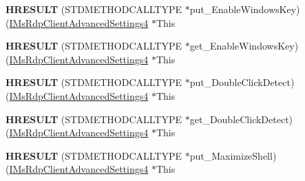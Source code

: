 \begin{DoxyCompactItemize}
\item 
\mbox{\label{struct_m_s_t_s_c_lib_1_1_i_ms_rdp_client_advanced_settings4_vtbl_a252c20e998252fad198e2894be5b028f}} 
{\bfseries H\+R\+E\+S\+U\+LT} (S\+T\+D\+M\+E\+T\+H\+O\+D\+C\+A\+L\+L\+T\+Y\+PE $\ast$put\+\_\+\+Enable\+Windows\+Key)(\hyperlink{interface_m_s_t_s_c_lib_1_1_i_ms_rdp_client_advanced_settings4}{I\+Ms\+Rdp\+Client\+Advanced\+Settings4} $\ast$This
\item 
\mbox{\label{struct_m_s_t_s_c_lib_1_1_i_ms_rdp_client_advanced_settings4_vtbl_ae6e5c60e4fe952a0ccb8ab9610f5e09a}} 
{\bfseries H\+R\+E\+S\+U\+LT} (S\+T\+D\+M\+E\+T\+H\+O\+D\+C\+A\+L\+L\+T\+Y\+PE $\ast$get\+\_\+\+Enable\+Windows\+Key)(\hyperlink{interface_m_s_t_s_c_lib_1_1_i_ms_rdp_client_advanced_settings4}{I\+Ms\+Rdp\+Client\+Advanced\+Settings4} $\ast$This
\item 
\mbox{\label{struct_m_s_t_s_c_lib_1_1_i_ms_rdp_client_advanced_settings4_vtbl_a7fed374046162a2b6362f1dbaa1c4608}} 
{\bfseries H\+R\+E\+S\+U\+LT} (S\+T\+D\+M\+E\+T\+H\+O\+D\+C\+A\+L\+L\+T\+Y\+PE $\ast$put\+\_\+\+Double\+Click\+Detect)(\hyperlink{interface_m_s_t_s_c_lib_1_1_i_ms_rdp_client_advanced_settings4}{I\+Ms\+Rdp\+Client\+Advanced\+Settings4} $\ast$This
\item 
\mbox{\label{struct_m_s_t_s_c_lib_1_1_i_ms_rdp_client_advanced_settings4_vtbl_afd88e227cbbe79d5ad8451f50e623e0a}} 
{\bfseries H\+R\+E\+S\+U\+LT} (S\+T\+D\+M\+E\+T\+H\+O\+D\+C\+A\+L\+L\+T\+Y\+PE $\ast$get\+\_\+\+Double\+Click\+Detect)(\hyperlink{interface_m_s_t_s_c_lib_1_1_i_ms_rdp_client_advanced_settings4}{I\+Ms\+Rdp\+Client\+Advanced\+Settings4} $\ast$This
\item 
\mbox{\label{struct_m_s_t_s_c_lib_1_1_i_ms_rdp_client_advanced_settings4_vtbl_a064ea7fba8d2af2865fc58c582eba7f7}} 
{\bfseries H\+R\+E\+S\+U\+LT} (S\+T\+D\+M\+E\+T\+H\+O\+D\+C\+A\+L\+L\+T\+Y\+PE $\ast$put\+\_\+\+Maximize\+Shell)(\hyperlink{interface_m_s_t_s_c_lib_1_1_i_ms_rdp_client_advanced_settings4}{I\+Ms\+Rdp\+Client\+Advanced\+Settings4} $\ast$This
\item 

\end{DoxyCompactItemize}
